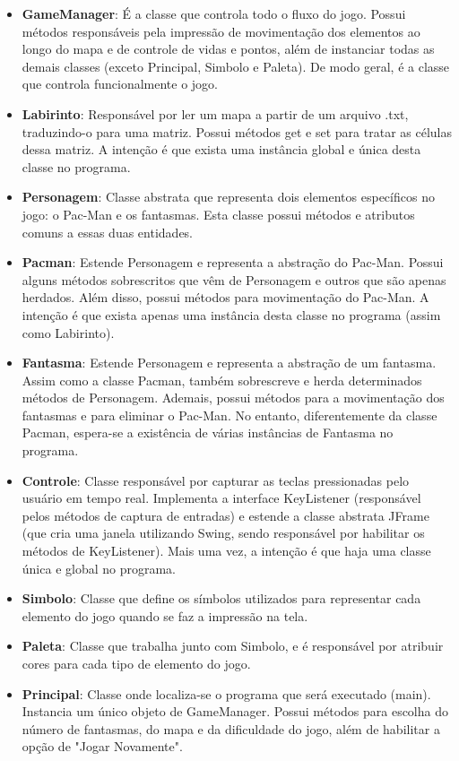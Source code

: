 \documentclass[]{article}
\begin{document}
\begin{itemize}
	\item \textbf{GameManager}: É a classe que controla todo o fluxo do jogo. Possui métodos responsáveis pela impressão de movimentação dos elementos ao longo do mapa e de controle de vidas e pontos, além de instanciar todas as demais classes (exceto Principal, Simbolo e Paleta). De modo geral, é a classe que controla funcionalmente o jogo. 
	\item \textbf{Labirinto}: Responsável por ler um mapa a partir de um arquivo .txt, traduzindo-o para uma matriz. Possui métodos get e set para tratar as células dessa matriz. A intenção é que exista uma instância global e única desta classe no programa.
	\item \textbf{Personagem}: Classe abstrata que representa dois elementos específicos no jogo: o Pac-Man e os fantasmas. Esta classe possui métodos e atributos comuns a essas duas entidades.
	\item \textbf{Pacman}: Estende Personagem e representa a abstração do Pac-Man. Possui alguns métodos sobrescritos que vêm de Personagem e outros que são apenas herdados. Além disso, possui métodos para movimentação do Pac-Man. A intenção é que exista apenas uma instância desta classe no programa (assim como Labirinto).
	\item \textbf{Fantasma}: Estende Personagem e representa a abstração de um fantasma. Assim como a classe Pacman, também sobrescreve e herda determinados métodos de Personagem. Ademais, possui métodos para a movimentação dos fantasmas e para eliminar o Pac-Man. No entanto, diferentemente da classe Pacman, espera-se a existência de várias instâncias de Fantasma no programa.
	\item \textbf{Controle}: Classe responsável por capturar as teclas pressionadas pelo usuário em tempo real. Implementa a interface KeyListener (responsável pelos métodos de captura de entradas) e estende a classe abstrata JFrame (que cria uma janela utilizando Swing, sendo responsável por habilitar os métodos de KeyListener). Mais uma vez, a intenção é que haja uma classe única e global no programa.
	\item \textbf{Simbolo}: Classe que define os símbolos utilizados para representar cada elemento do jogo quando se faz a impressão na tela.
	\item \textbf{Paleta}: Classe que trabalha junto com Simbolo, e é responsável por atribuir cores para cada tipo de elemento do jogo.
	\item \textbf{Principal}: Classe onde localiza-se o programa que será executado (main). Instancia um único objeto de GameManager. Possui métodos para escolha do número de fantasmas, do mapa e da dificuldade do jogo, além de habilitar a opção de "Jogar Novamente".
\end{itemize}
\end{document}
